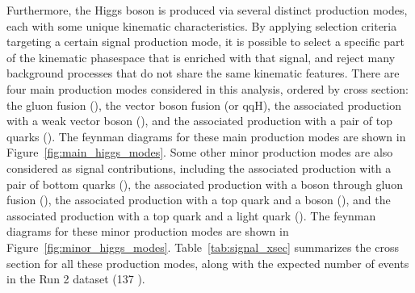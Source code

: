 Furthermore, the Higgs boson is produced via several distinct production modes, each with some unique kinematic characteristics. 
By applying selection criteria targeting a certain signal production mode, it is possible to select a specific part of the kinematic phasespace that is enriched with that signal, 
and reject many background processes that do not share the same kinematic features. 
There are four main production modes considered in this analysis, ordered by cross section: the gluon fusion (\ggH), the vector boson fusion (\qqH or qqH), 
the associated production with a weak vector boson (\VH), and the associated production with a pair of top quarks (\ttH). 
The feynman diagrams for these main production modes are shown in Figure~\ref{fig:main_higgs_modes}.
Some other minor production modes are also considered as signal contributions, including the associated production with a pair of bottom quarks (\bbH),
the associated production with a \PZ boson through gluon fusion (\ggZH), the associated production with a top quark and a \PW boson (\tHW), 
and the associated production with a top quark and a light quark (\tHq). 
The feynman diagrams for these minor production modes are shown in Figure~\ref{fig:minor_higgs_modes}.
Table~\ref{tab:signal_xsec} summarizes the cross section for all these production modes, 
along with the expected number of events in the Run 2 dataset (137 \invfb).

